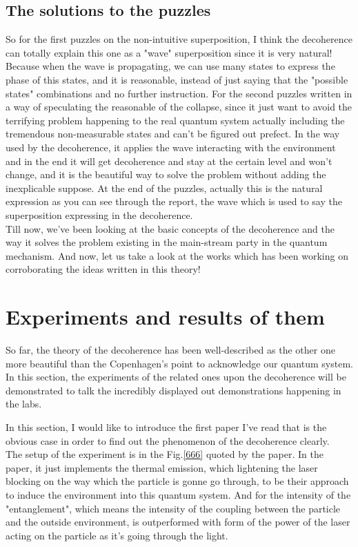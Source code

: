 \documentclass[final,1p,12pt]{elsarticle}
\begin{document}
\subsection{The solutions to the puzzles}
So for the first puzzles on the non-intuitive superposition, I think the decoherence can totally explain this one as a "wave" superposition since it is very natural! Because when the wave is propagating, we can use many states to express the phase of this states, and it is reasonable, instead of just saying that the "possible states" combinations and no further instruction. For the second puzzles written in a way of speculating the reasonable of the collapse, since it just want to avoid the terrifying problem happening to the real quantum system actually including the tremendous non-measurable states and can't be figured out prefect.  In the way used by the decoherence, it applies the wave interacting with the environment and in the end it will get decoherence and stay at the certain level and won't change, and it is the beautiful way to solve the problem without adding the inexplicable suppose. At the end of the puzzles, actually this is the natural expression as you can see through the report, the wave which is used to say the superposition expressing in the decoherence.\\

Till now, we've been looking at the basic concepts of the decoherence and the way it solves the problem existing in the main-stream party in the quantum mechanism. And now, let us take a look at the works which has been working on corroborating the ideas written in this theory!

\section{Experiments and results of them} 
So far, the theory of the decoherence has been well-described as the other one more beautiful than the Copenhagen's point to acknowledge our quantum system. In this section, the experiments of the related ones upon the decoherence will be demonstrated to talk the incredibly displayed out demonstrations happening in the labs.

In this section, I would like to introduce the first paper\cite{Hackerm_ller_2004} I've read that is the obvious case in order to find out the phenomenon of the decoherence clearly.\\

The setup of the experiment is in the Fig.\ref{666} quoted by the paper. In the paper, it just implements the thermal emission, which lightening the laser blocking on the way which the particle is gonne go through, to be their approach to induce the environment into this quantum system. And for the intensity of the "entanglement", which means the intensity of the coupling between the particle and the outside environment, is outperformed with form of the power of the laser acting on the particle as it's going through the light.\\
\end{document}
